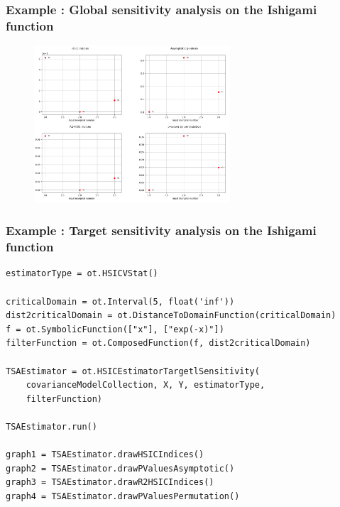 \documentclass[aspectratio=169]{beamer}
\begin{document}
\begin{frame}
\frametitle{Example : Global sensitivity analysis on the Ishigami function}

\begin{figure}
   \includegraphics[width=0.65\textwidth]{figures/HSIC1.png}
\end{figure}
\end{frame}




\begin{frame}[containsverbatim]	
\frametitle{Example : Target sensitivity analysis on the Ishigami function}
\begin{small}

\begin{lstlisting}
estimatorType = ot.HSICVStat()

criticalDomain = ot.Interval(5, float('inf'))
dist2criticalDomain = ot.DistanceToDomainFunction(criticalDomain)
f = ot.SymbolicFunction(["x"], ["exp(-x)"])
filterFunction = ot.ComposedFunction(f, dist2criticalDomain)

TSAEstimator = ot.HSICEstimatorTargetlSensitivity(
    covarianceModelCollection, X, Y, estimatorType, 
    filterFunction)
    
TSAEstimator.run()

graph1 = TSAEstimator.drawHSICIndices()
graph2 = TSAEstimator.drawPValuesAsymptotic()
graph3 = TSAEstimator.drawR2HSICIndices()
graph4 = TSAEstimator.drawPValuesPermutation()
\end{lstlisting}

\end{small}
\end{frame}
\end{document}
